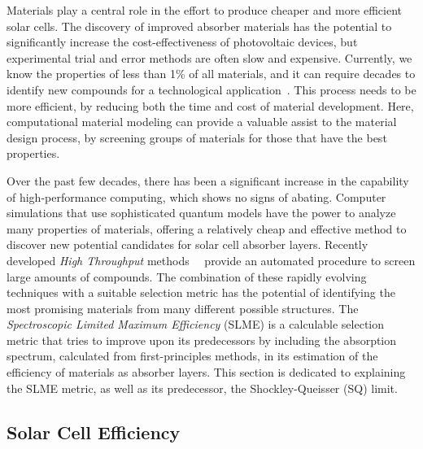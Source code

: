 \begin{refsection}
Materials play a central role in the effort to produce cheaper and more 
efficient solar cells. The discovery of improved absorber materials has the 
potential to significantly increase the cost-effectiveness of photovoltaic 
devices, but experimental trial and error methods are often slow and 
expensive. Currently, we know the properties of less than 1\% of all 
materials, and it can require decades to identify new compounds for a 
technological application~\cite{Jain2013}. This process needs to be more 
efficient, by reducing both the time and cost of material development. Here, 
computational material modeling can provide a valuable assist to the material 
design process, by screening groups of materials for those that have the best 
properties.  
 
Over the past few decades, there has been a significant increase in the 
capability of high-performance computing, which shows no signs of abating. 
Computer simulations that use sophisticated quantum models have the power to 
analyze many properties of materials, offering a relatively cheap and 
effective method to discover new potential candidates for solar cell absorber 
layers. Recently developed \textit{High Throughput} 
methods~\cite{Curtarolo2013}~\cite{Sarmadian2016} provide an automated 
procedure to screen large amounts of compounds. The combination of these 
rapidly evolving techniques with a suitable selection metric has the potential 
of identifying the most promising materials from many different possible 
structures. The \textit{Spectroscopic Limited Maximum Efficiency} (SLME) is a 
calculable selection metric that tries to improve upon its predecessors by 
including the absorption spectrum, calculated from first-principles methods, 
in its estimation of the efficiency of materials as absorber layers. This 
section is dedicated to explaining the SLME metric, as well as its 
predecessor, the Shockley-Queisser (SQ) limit.  
 
\subsection{Solar Cell Efficiency} \label{slme:sec-efficiency} 
 

\end{refsection}
